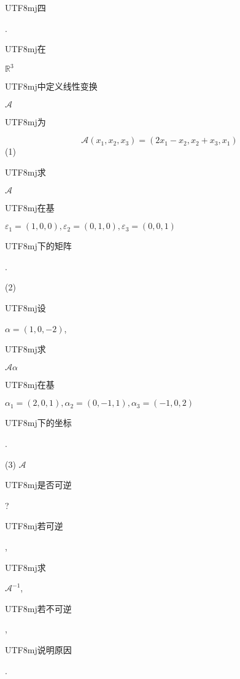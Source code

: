 \documentclass[10pt]{article}
\begin{document}
\begin{CJK}{UTF8}{mj}四\end{CJK}. \begin{CJK}{UTF8}{mj}在\end{CJK} $\mathbb{R}^{3}$ \begin{CJK}{UTF8}{mj}中定义线性变换\end{CJK} $\mathscr{A}$ \begin{CJK}{UTF8}{mj}为\end{CJK}
$$
\mathscr{A}\left(x_{1}, x_{2}, x_{3}\right)=\left(2 x_{1}-x_{2}, x_{2}+x_{3}, x_{1}\right)
$$
(1) \begin{CJK}{UTF8}{mj}求\end{CJK} $\mathscr{A}$ \begin{CJK}{UTF8}{mj}在基\end{CJK} $\varepsilon_{1}=(1,0,0), \varepsilon_{2}=(0,1,0), \varepsilon_{3}=(0,0,1)$ \begin{CJK}{UTF8}{mj}下的矩阵\end{CJK}.

(2) \begin{CJK}{UTF8}{mj}设\end{CJK} $\alpha=(1,0,-2)$, \begin{CJK}{UTF8}{mj}求\end{CJK} $\mathscr{A} \alpha$ \begin{CJK}{UTF8}{mj}在基\end{CJK} $\alpha_{1}=(2,0,1), \alpha_{2}=(0,-1,1), \alpha_{3}=(-1,0,2)$ \begin{CJK}{UTF8}{mj}下的坐标\end{CJK}.

(3) $\mathscr{A}$ \begin{CJK}{UTF8}{mj}是否可逆\end{CJK}? \begin{CJK}{UTF8}{mj}若可逆\end{CJK}, \begin{CJK}{UTF8}{mj}求\end{CJK} $\mathscr{A}^{-1}$, \begin{CJK}{UTF8}{mj}若不可逆\end{CJK}, \begin{CJK}{UTF8}{mj}说明原因\end{CJK}.
\end{document}
